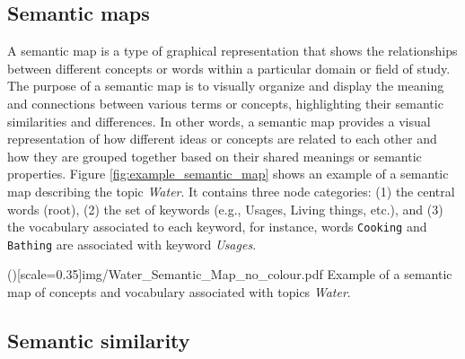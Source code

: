 \documentclass{ieeeaccess}
\begin{document}
\subsection{Semantic maps}

A semantic map is a type of graphical representation that shows the 
relationships between different concepts or words within a particular 
domain or field of study. The purpose of a semantic map is to visually 
organize and display the meaning and connections between various terms 
or concepts, highlighting their semantic similarities and differences. 
In other words, a semantic map provides a visual representation of how 
different ideas or concepts are related to each other and how they are
grouped together based on their shared meanings or semantic properties. 
Figure  \ref{fig:example_semantic_map} shows an
example of a semantic map describing the topic \textit{Water}. It
contains three node categories: (1) the central words (root), (2)
the set of keywords (e.g., Usages, Living things, etc.), and (3) the
vocabulary associated to each keyword, for instance, words
\texttt{Cooking} and \texttt{Bathing} are associated with keyword 
\textit{Usages}.

\Figure[h]()[scale=0.35]{img/Water_Semantic_Map_no_colour.pdf}
{Example of a semantic map of concepts and vocabulary  associated with
topics \textit{Water}.\label{fig:example_semantic_map}}

\subsection{Semantic similarity}
\end{document}
